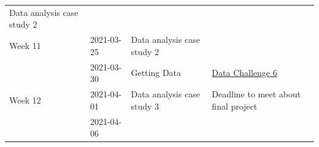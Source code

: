 \documentclass[
]{book}
\begin{document}
\begin{longtable}[]{@{}llll@{}}
\begin{minipage}[t]{0.22\columnwidth}
Data analysis case study 2\strut
\end{minipage} & \begin{minipage}[t]{0.22\columnwidth}\raggedright
\strut
\end{minipage}\tabularnewline
\begin{minipage}[t]{0.22\columnwidth}\raggedright
Week 11\strut
\end{minipage} & \begin{minipage}[t]{0.22\columnwidth}\raggedright
2021-03-25\strut
\end{minipage} & \begin{minipage}[t]{0.22\columnwidth}\raggedright
Data analysis case study 2\strut
\end{minipage} & \begin{minipage}[t]{0.22\columnwidth}\raggedright
\strut
\end{minipage}\tabularnewline
\begin{minipage}[t]{0.22\columnwidth}\raggedright
\strut
\end{minipage} & \begin{minipage}[t]{0.22\columnwidth}\raggedright
2021-03-30\strut
\end{minipage} & \begin{minipage}[t]{0.22\columnwidth}\raggedright
Getting Data\strut
\end{minipage} & \begin{minipage}[t]{0.22\columnwidth}\raggedright
\href{https://classroom.github.com/a/MuuK7xMS}{Data Challenge 6}\strut
\end{minipage}\tabularnewline
\begin{minipage}[t]{0.22\columnwidth}\raggedright
Week 12\strut
\end{minipage} & \begin{minipage}[t]{0.22\columnwidth}\raggedright
2021-04-01\strut
\end{minipage} & \begin{minipage}[t]{0.22\columnwidth}\raggedright
Data analysis case study 3\strut
\end{minipage} & \begin{minipage}[t]{0.22\columnwidth}\raggedright
Deadline to meet about final project\strut
\end{minipage}\tabularnewline
\begin{minipage}[t]{0.22\columnwidth}\raggedright
\strut
\end{minipage} & \begin{minipage}[t]{0.22\columnwidth}\raggedright
2021-04-06\strut

\end{minipage}
\end{longtable}
\end{document}

